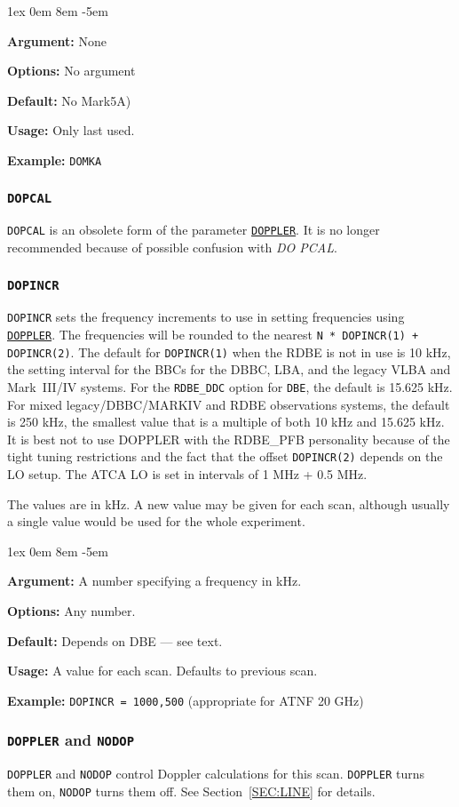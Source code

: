 \documentclass{report}
\newcommand{\rcwbox}[5]{
  \begin{list}{}{\parsep 1ex  \itemsep 0em
                 \leftmargin 8em  \itemindent -5em }
    \item {\bf Argument:} #1
    \item {\bf Options:}  #2
    \item {\bf Default:}  #3
    \item {\bf Usage:}    #4
    \item {\bf Example:}  #5
  \end{list}
}
\begin{document}
\rcwbox
{None}
{No argument}
{No Mark5A)}
{Only last used.}
{{\tt DOMKA}}



\subsubsection{\label{MP:DOPCAL}{\tt DOPCAL}}

{\tt DOPCAL} is an obsolete form of the parameter
{\hyperref[MP:DOPPLER]{{\tt DOPPLER}}}.
It is no longer recommended because of possible confusion with
{\em DO PCAL}.

\subsubsection{\label{MP:DOPINCR}{\tt DOPINCR}}

{\tt DOPINCR} sets the frequency increments to use in setting
frequencies using 
{\hyperref[MP:DOPPLER]{{\tt DOPPLER}}}.  The
frequencies will be rounded to the nearest {\tt N * DOPINCR(1) +
DOPINCR(2)}.  The default for {\tt DOPINCR(1)} when the RDBE is not in
use is 10 kHz, the setting interval for the BBCs for the DBBC, LBA,
and the legacy VLBA and Mark~III/IV systems.  For the {\tt RDBE\_DDC}
option for {\tt DBE}, the default is 15.625 kHz.  For mixed
legacy/DBBC/MARKIV and RDBE observations systems, the default is 250
kHz, the smallest value that is a multiple of both 10 kHz and 15.625
kHz.  It is best not to use DOPPLER with the RDBE\_PFB personality
because of the tight tuning restrictions and the fact that the offset
{\tt DOPINCR(2)} depends on the LO setup.  The ATCA LO is set in
intervals of 1 MHz + 0.5 MHz.

The values are in kHz.  A new value may be given for each scan,
although usually a single value would be used for the whole
experiment.

\rcwbox
{A number specifying a frequency in kHz.}
{Any number.}
{Depends on DBE --- see text.}
{A value for each scan.  Defaults to previous scan.}
{{\tt DOPINCR = 1000,500} (appropriate for ATNF 20 GHz)}


\subsubsection{\label{MP:DOPPLER}{\tt DOPPLER} and {\tt NODOP}}

{\tt DOPPLER} and {\tt NODOP} control Doppler calculations for this
scan.  {\tt DOPPLER} turns them on, {\tt NODOP} turns them off.
See Section~\ref{SEC:LINE} for details.
\end{document}
